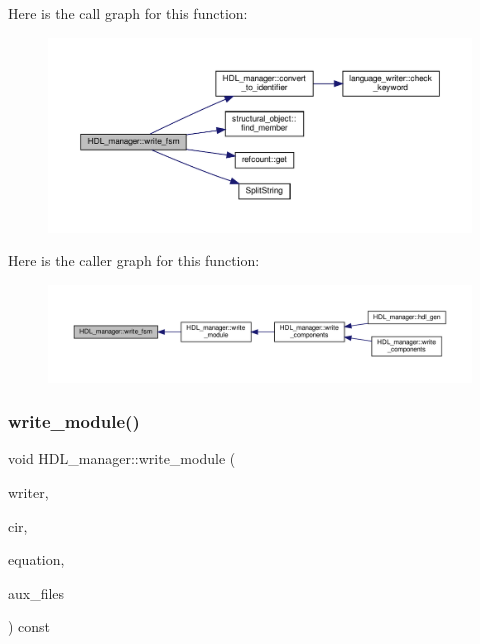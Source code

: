 Here is the call graph for this function\+:
\nopagebreak
\begin{figure}[H]
\begin{center}
\leavevmode
\includegraphics[width=350pt]{d7/d32/classHDL__manager_a87ef5b67f3ed867fff727d9b3f161795_cgraph}
\end{center}
\end{figure}
Here is the caller graph for this function\+:
\nopagebreak
\begin{figure}[H]
\begin{center}
\leavevmode
\includegraphics[width=350pt]{d7/d32/classHDL__manager_a87ef5b67f3ed867fff727d9b3f161795_icgraph}
\end{center}
\end{figure}
\mbox{\label{classHDL__manager_a0e67d86aca71fada08a10096cac3396a}} 
\subsubsection{\texorpdfstring{write\+\_\+module()}{write\_module()}}
{\footnotesize\ttfamily void H\+D\+L\+\_\+manager\+::write\+\_\+module (\begin{DoxyParamCaption}\item[{const \hyperlink{language__writer_8hpp_ab5bb59a651cbff3f3c83b0f51c0b0b71}{language\+\_\+writer\+Ref}}]{writer,  }\item[{const \hyperlink{structural__objects_8hpp_a8ea5f8cc50ab8f4c31e2751074ff60b2}{structural\+\_\+object\+Ref}}]{cir,  }\item[{bool}]{equation,  }\item[{std\+::list$<$ std\+::string $>$ \&}]{aux\+\_\+files }\end{DoxyParamCaption}) const\hspace{0.3cm}{\ttfamily [private]}}




